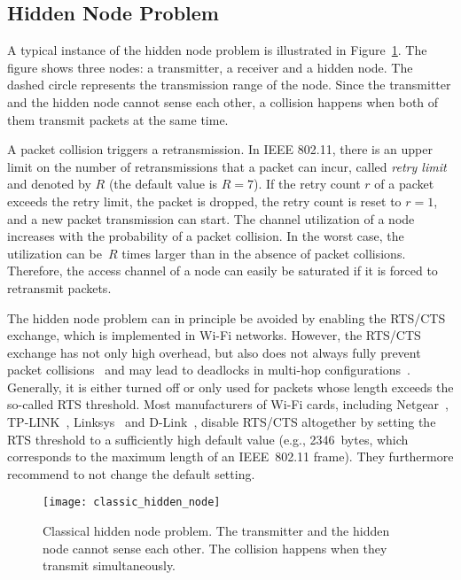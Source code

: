 \documentclass{IEEEtran}
\begin{document}
\subsection{Hidden Node Problem}
\label{Hidden Node Problem}
A typical instance of the hidden node problem is illustrated in
Figure~\ref{classic_hidden_node}. The figure shows three nodes: a transmitter,
a receiver and a hidden node. The dashed circle represents the
transmission range of the node. Since the transmitter and the hidden
node cannot sense each other, a collision happens when both of them
transmit packets at the same time.

A packet collision triggers a
retransmission. In IEEE 802.11, there is an upper limit on the number
of retransmissions that a packet can incur, called \textit{retry limit} and
denoted by $R$ (the default value is $R=7$). If the retry count $r$ of a packet exceeds the retry
limit, the packet is dropped, the retry count is reset to $r=1$, and a new packet transmission can start.  The channel utilization of a node increases with the
probability of a packet collision. In the worst case,
the utilization can be~$R$ times larger than in the absence of packet collisions. Therefore, the access channel of
a node can easily be saturated if it is forced to retransmit packets.

The hidden node problem can in principle be avoided by enabling the RTS/CTS exchange,
which is implemented in Wi-Fi networks. However, the RTS/CTS exchange has not only high overhead, but also does not always fully prevent packet
collisions~\cite{ray2005evaluation}
and may lead to deadlocks in multi-hop configurations~\cite{ray2007false}.
Generally, it is either turned off
\cite{bellardo2003802} or only used for packets whose length exceeds the so-called RTS
threshold. Most manufacturers of Wi-Fi cards, including Netgear~\cite{netgear}, TP-LINK~\cite{tp-link}, Linksys~\cite{linksys} and
D-Link~\cite{d-link}, disable RTS/CTS altogether by setting the RTS
threshold to a sufficiently high default value (e.g., 2346~bytes, which corresponds to the maximum length of an IEEE~802.11 frame).
They furthermore recommend to not change the default setting.





\begin{figure}[!t]
\centering
\texttt{[image: classic\_hidden\_node]}
\caption{Classical hidden node problem. The transmitter and the hidden
  node cannot sense each other. The collision happens when they
  transmit simultaneously.}
\label{classic_hidden_node}
\end{figure}
\end{document}
